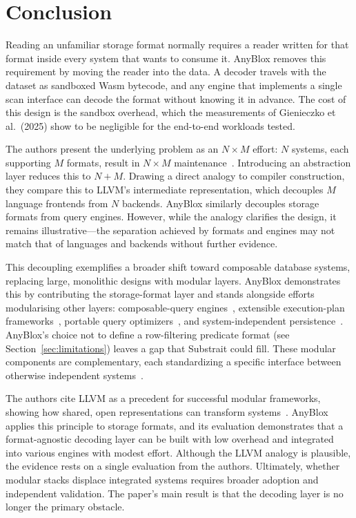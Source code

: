 \section{Conclusion}
\label{sec:conclusion}

Reading an unfamiliar storage format normally requires a reader written for that format inside every system that wants to consume it. AnyBlox removes this requirement by moving the reader into the data. A decoder travels with the dataset as sandboxed Wasm bytecode, and any engine that implements a single scan interface can decode the format without knowing it in advance. The cost of this design is the sandbox overhead, which the measurements of Gienieczko et al.\ (2025) show to be negligible for the end-to-end workloads tested.

The authors present the underlying problem as an $N \times M$ effort: $N$ systems, each supporting $M$ formats, result in $N \times M$ maintenance~\cite{gienieczkoAnyBloxFrameworkSelfDecoding2025}. Introducing an abstraction layer reduces this to $N + M$. Drawing a direct analogy to compiler construction, they compare this to LLVM's intermediate representation, which decouples $M$ language frontends from $N$ backends. AnyBlox similarly decouples storage formats from query engines. However, while the analogy clarifies the design, it remains illustrative—the separation achieved by formats and engines may not match that of languages and backends without further evidence.

This decoupling exemplifies a broader shift toward composable database systems, replacing large, monolithic designs with modular layers. AnyBlox demonstrates this by contributing the storage-format layer and stands alongside efforts modularising other layers: composable-query engines~\cite{lambApacheArrowDataFusion2024}, extensible execution-plan frameworks~\cite{bandleDatabaseTechnologyMasses2021,jungmairDeclarativeSubOperatorsUniversal2023}, portable query optimizers~\cite{alotaibiQueryOptimizerService2024,anneserAutoSteerLearnedQuery2023}, and system-independent persistence~\cite{tsalapatisMemSnapMCheckpointsData2024}. AnyBlox's choice not to define a row-filtering predicate format (see Section~\ref{sec:limitations}) leaves a gap that Substrait could fill. These modular components are complementary, each standardizing a specific interface between otherwise independent systems~\cite{gienieczkoAnyBloxFrameworkSelfDecoding2025}.

The authors cite LLVM as a precedent for successful modular frameworks, showing how shared, open representations can transform systems~\cite{gienieczkoAnyBloxFrameworkSelfDecoding2025, lattnerLLVMCompilationFramework2004}. AnyBlox applies this principle to storage formats, and its evaluation demonstrates that a format-agnostic decoding layer can be built with low overhead and integrated into various engines with modest effort. Although the LLVM analogy is plausible, the evidence rests on a single evaluation from the authors. Ultimately, whether modular stacks displace integrated systems requires broader adoption and independent validation. The paper's main result is that the decoding layer is no longer the primary obstacle.